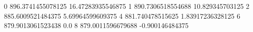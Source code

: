 0 896.3741455078125 16.47283935546875
1 890.7306518554688 10.829345703125
2 885.6009521484375 5.69964599609375
4 881.740478515625 1.83917236328125
6 879.9013061523438 0.0
8 879.0011596679688 -0.900146484375
